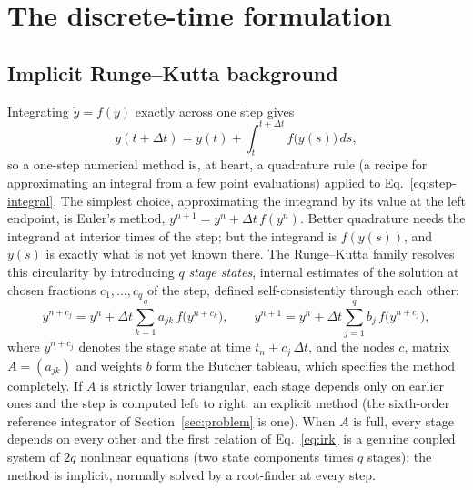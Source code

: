 \documentclass[11pt,a4paper]{article}
\begin{document}
\section{The discrete-time formulation}
\label{sec:disc-method}

\subsection{Implicit Runge--Kutta background}

Integrating $\dot y = f(y)$ exactly across one step gives
\begin{equation}
  y(t + \Delta t) = y(t) + \int_t^{t+\Delta t} f\big(y(s)\big)\, ds ,
  \label{eq:step-integral}
\end{equation}
so a one-step numerical method is, at heart, a quadrature rule (a recipe
for approximating an integral from a few point evaluations) applied to
Eq.~\eqref{eq:step-integral}. The simplest choice, approximating the
integrand by its value at the left endpoint, is Euler's method,
$y^{n+1} = y^n + \Delta t\, f(y^n)$. Better quadrature needs the
integrand at interior times of the step; but the integrand is
$f(y(s))$, and $y(s)$ is exactly what is not yet known there. The
Runge--Kutta family resolves this circularity by introducing $q$
\emph{stage states}, internal estimates of the solution at chosen
fractions $c_1, \dots, c_q$ of the step, defined self-consistently
through each other:
\begin{equation}
  y^{n+c_j} = y^n + \Delta t \sum_{k=1}^{q} a_{jk}\, f\big(y^{n+c_k}\big),
  \qquad
  y^{n+1} = y^n + \Delta t \sum_{j=1}^{q} b_j\, f\big(y^{n+c_j}\big),
  \label{eq:irk}
\end{equation}
where $y^{n+c_j}$ denotes the stage state at time $t_n + c_j\,\Delta t$,
and the nodes $c$, matrix $A = (a_{jk})$ and weights $b$ form the Butcher
tableau, which specifies the method completely. If $A$ is strictly
lower triangular, each stage depends only on earlier ones and the step is
computed left to right: an explicit method (the sixth-order reference
integrator of Section~\ref{sec:problem} is one). When $A$ is full, every
stage depends on every other and the first relation of
Eq.~\eqref{eq:irk} is a genuine coupled system of $2q$ nonlinear
equations (two state components times $q$ stages): the method is
implicit, normally solved by a root-finder at every step.
\end{document}

